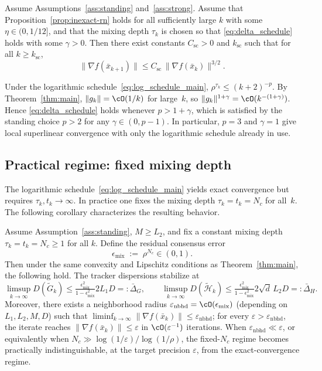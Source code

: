 \documentclass[review,onefignum,onetabnum]{siamart171218}
\begin{document}
\begin{theorem}\label{thm:superlinear}
Assume Assumptions~\ref{ass:standing} and~\ref{ass:strong}.
Assume that Proposition~\ref{prop:inexact-rn} holds for all sufficiently large $k$ with some $\eta\in(0,1/12]$,
and that the mixing depth $\tau_k$ is chosen so that \eqref{eq:delta_schedule} holds with some $\gamma>0$.
Then there exist constants $C_{\mathrm{sc}}>0$ and $k_{\mathrm{sc}}$ such that for all $k\ge k_{\mathrm{sc}}$,
\[
\|\nabla f(\bar x_{k+1})\|\le C_{\mathrm{sc}}\,\|\nabla f(\bar x_k)\|^{3/2}.
\]
\end{theorem}

\begin{remark}
Under the logarithmic schedule~\eqref{eq:log_schedule_main},
$\rho^{\tau_k}\le(k+2)^{-p}$.
By Theorem~\ref{thm:main}, $\|g_k\|=\cO(1/k)$ for large~$k$, so
$\|g_k\|^{1+\gamma}=\cO(k^{-(1+\gamma)})$.
Hence \eqref{eq:delta_schedule} holds whenever $p>1+\gamma$,
which is satisfied by the standing choice $p>2$ for any
$\gamma\in(0,p{-}1)$.
In particular, $p=3$ and $\gamma=1$ give local superlinear
convergence with only the logarithmic schedule already in use.
\end{remark}

\subsection{Practical regime: fixed mixing depth}\label{ssec:fixed_nc}

The logarithmic schedule~\eqref{eq:log_schedule_main} yields exact
convergence but requires $\tau_k,t_k\to\infty$.
In practice one fixes the mixing depth $\tau_k=t_k=N_c$ for all~$k$.
The following corollary characterizes the resulting behavior.

\begin{corollary}\label{cor:fixed_nc}
Assume Assumption~\ref{ass:standing}, $M\ge L_2$, and fix a constant mixing depth $\tau_k=t_k=N_c\ge 1$ for all $k$.
Define the residual consensus error
\[
\epsilon_{\mathrm{mix}} \;:=\; \rho^{N_c}\in(0,1).
\]
Then under the same convexity and Lipschitz conditions as Theorem~\ref{thm:main},
the following hold.
The tracker dispersions stabilize at
\[
	\limsup_{k\to\infty} D(\tilde G_k)
	\le \tfrac{\epsilon_{\mathrm{mix}}^2}{1-\epsilon_{\mathrm{mix}}^2}2L_1D
	=: \bar\Delta_G,
	\qquad
	\limsup_{k\to\infty} D(\tilde{\mathcal H}_k)
	\le \tfrac{\epsilon_{\mathrm{mix}}^2}{1-\epsilon_{\mathrm{mix}}^2}2\sqrt{d}\,L_2D
	=: \bar\Delta_H.
\]
Moreover, there exists a neighborhood radius $\varepsilon_{\mathrm{nbhd}}=\cO(\epsilon_{\mathrm{mix}})$
(depending on $L_1,L_2,M,D$) such that
$\liminf_{k\to\infty}\|\nabla f(\bar x_k)\|\le \varepsilon_{\mathrm{nbhd}}$;
for every $\varepsilon>\varepsilon_{\mathrm{nbhd}}$, the iterate reaches
$\|\nabla f(\bar x_k)\|\le \varepsilon$ in $\cO(\varepsilon^{-1})$ iterations.
When $\varepsilon_{\mathrm{nbhd}}\ll\varepsilon$,
or equivalently when $N_c\gg \log(1/\varepsilon)/\log(1/\rho)$,
the fixed-$N_c$ regime becomes practically indistinguishable, at the target precision $\varepsilon$, from the exact-convergence regime.
\end{corollary}
\end{document}

